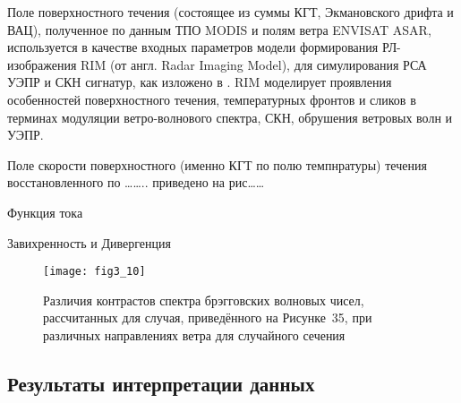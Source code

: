 Поле поверхностного течения (состоящее из суммы КГТ, Экмановского дрифта и ВАЦ), полученное по данным ТПО MODIS и полям ветра ENVISAT ASAR, используется в качестве входных параметров модели формирования РЛ-изображения RIM (от англ. Radar Imaging Model), для симулирования РСА УЭПР и СКН сигнатур, как изложено в \citep{Kudryavtsev2005,Johannessen2005}. RIM моделирует проявления особенностей поверхностного течения, температурных фронтов и сликов в терминах модуляции ветро-волнового спектра, СКН, обрушения ветровых волн и УЭПР. 

Поле скорости поверхностного (именно КГТ по полю темпнратуры) течения восстановленного по \dots \dots .. приведено на рис\dots \dots 

Функция тока

Завихренность и Дивергенция



\begin{figure}[H]
    \texttt{[image: fig3\_10]}
    \caption{Различия контрастов спектра брэгговских волновых чисел, рассчитанных для случая, приведённого на Рисунке~35, при различных направлениях ветра для случайного сечения}
    \label{fig:3.10}
\end{figure}



\subsection{Результаты интерпретации данных} \label{sec:3.3.1}


